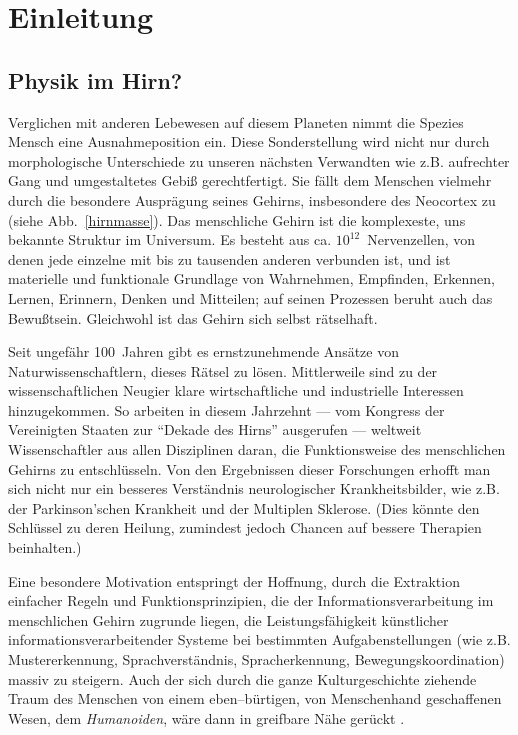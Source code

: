 \section{Einleitung}
\label{einleitung}
\thispagestyle{plain}

\subsection{Physik im Hirn?}

Verglichen mit anderen Lebewesen auf diesem Planeten nimmt die Spezies
Mensch eine Ausnahmeposition ein.  Diese Sonderstellung wird nicht nur
durch morphologische Unterschiede zu unseren nächsten Verwandten wie
z.B. aufrechter Gang und umgestaltetes Gebiß gerechtfertigt. Sie fällt
dem Menschen vielmehr durch die besondere Ausprägung seines Gehirns,
insbesondere des Neocortex zu (siehe Abb.~\ref{hirnmasse}).  Das
menschliche Gehirn ist die komplexeste, uns bekannte Struktur im Universum.
Es besteht aus ca. $10^{12}$~Nervenzellen, von denen jede einzelne mit bis
zu tausenden anderen verbunden ist, und ist materielle und funktionale
Grundlage von Wahrnehmen, Empfinden, Erkennen, Lernen, Erinnern, Denken und
Mitteilen; auf seinen Prozessen beruht auch das Bewußtsein. Gleichwohl ist
das Gehirn sich selbst rätselhaft.

Seit ungefähr 100~Jahren gibt es ernstzunehmende Ansätze von
Naturwissenschaftlern, dieses Rätsel zu lösen.  Mittlerweile sind zu der
wissenschaftlichen Neugier klare wirtschaftliche und industrielle
Interessen hinzugekommen. So arbeiten in diesem Jahrzehnt --- vom Kongress
der Vereinigten Staaten zur ``Dekade des Hirns'' ausgerufen --- weltweit
Wissenschaftler aus allen Disziplinen daran, die Funktionsweise des
menschlichen Gehirns zu entschlüsseln. Von den Ergebnissen dieser
Forschungen erhofft man sich nicht nur ein besseres Verständnis
neurologischer Krankheitsbilder, wie z.B. der Parkinson'schen Krankheit und
der Multiplen Sklerose. (Dies könnte den Schlüssel zu deren Heilung,
zumindest jedoch Chancen auf bessere Therapien beinhalten.)

Eine besondere Motivation entspringt der Hoffnung, durch die Extraktion
einfacher Regeln und Funktionsprinzipien, die der Informationsverarbeitung
im menschlichen Gehirn zugrunde liegen, die Leistungsfähigkeit
künstlicher informationsverarbeitender Systeme bei bestimmten
Aufgabenstellungen (wie z.B. Mustererkennung, Sprachverständnis,
Spracherkennung, Bewegungskoordination) massiv zu steigern. Auch der sich
durch die ganze Kulturgeschichte ziehende Traum des Menschen von einem
eben--bürtigen, von Menschenhand geschaffenen Wesen, dem \emph{Humanoiden},
wäre dann in greifbare Nähe gerückt \parencite[zum Stand der Dinge siehe z.B.][]{brooks:1990}.


